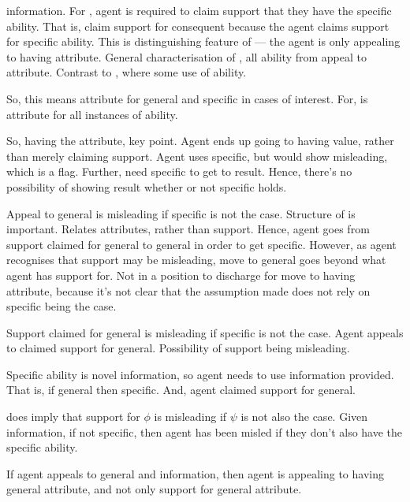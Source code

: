 \begin{note}
  \gsi{} information.
  For \AR{}, agent is required to claim support that they have the specific ability.
  That is, claim support for consequent because the agent claims support for specific ability.
  This is distinguishing feature of \AR{} --- the agent is only appealing to having attribute.
  General characterisation of \AR{}, all ability from appeal to attribute.
  Contrast to \WR{}, where some use of ability.

  So, this means attribute for general and specific in cases of interest.
  For, \AR{} is attribute for all instances of ability.

  {
    \color{green}
    So, having the attribute, key point.
    Agent ends up going to having value, rather than merely claiming support.
    Agent uses specific, but would show misleading, which is a flag.
    Further, need specific to get to result.
    Hence, there's no possibility of showing result whether or not specific holds.
  }

  {
    \color{red}
    Appeal to general is misleading if specific is not the case.
  }
  Structure of \gsi{} is important.
  Relates attributes, rather than support.
  Hence, agent goes from support claimed for general to general in order to get specific.
  However, as agent recognises that support may be misleading, move to general goes beyond what agent has support for.
  Not in a position to discharge for move to having attribute, because it's not clear that the assumption made does not rely on specific being the case.



  Support claimed for general is misleading if specific is not the case.
  Agent appeals to claimed support for general.
  Possibility of support being misleading.
  






  Specific ability is novel information, so agent needs to use information provided.
  That is, if general then specific.
  And, agent claimed support for general.

  \gsi{} does imply that support for \(\phi\) is misleading if \(\psi\) is not also the case.
  Given information, if not specific, then agent has been misled if they don't also have the specific ability.

    If agent appeals to general and information, then agent is appealing to having general attribute, and not only support for general attribute.
    
\end{note}

